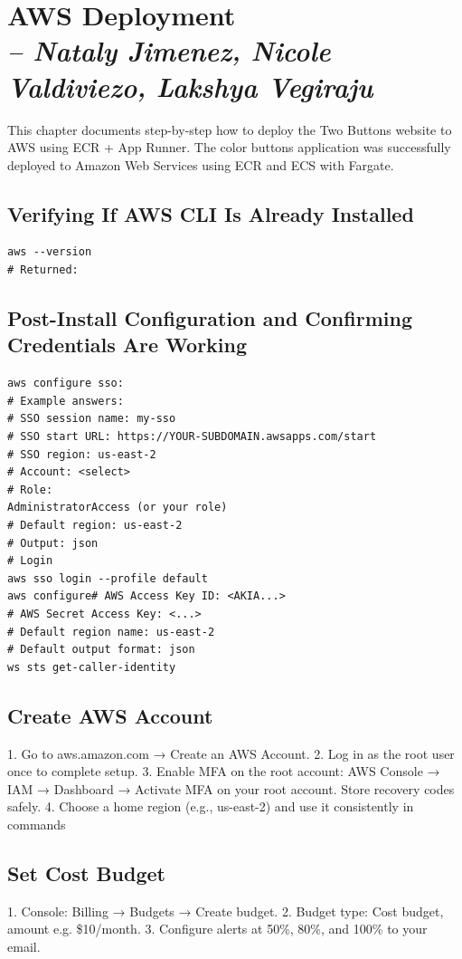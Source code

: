\chapter{AWS Deployment \\
\small{\textit{-- Nataly Jimenez, Nicole Valdiviezo, Lakshya Vegiraju}}
\label{Chapter::AWS Deployment}}

This chapter documents step-by-step how to deploy the Two Buttons website to AWS using ECR + App Runner. The color buttons application was successfully deployed to Amazon Web Services using ECR and ECS with Fargate.

\section{Verifying If AWS CLI Is Already Installed}

\begin{verbatim}
aws --version
# Returned: 
\end{verbatim}

\section{Post-Install Configuration and Confirming Credentials Are Working}
\begin{verbatim}
aws configure sso:
# Example answers:
# SSO session name: my-sso
# SSO start URL: https://YOUR-SUBDOMAIN.awsapps.com/start
# SSO region: us-east-2
# Account: <select>
# Role:
AdministratorAccess (or your role)
# Default region: us-east-2
# Output: json
# Login
aws sso login --profile default
aws configure# AWS Access Key ID: <AKIA...>
# AWS Secret Access Key: <...>
# Default region name: us-east-2
# Default output format: json
ws sts get-caller-identity
\end{verbatim}

\section{Create AWS Account}
1. Go to aws.amazon.com → Create an AWS Account.
2. Log in as the root user once to complete setup.
3. Enable MFA on the root account: AWS Console → IAM → Dashboard → Activate MFA on
your root account. Store recovery codes safely.
4. Choose a home region (e.g., us-east-2) and use it consistently in commands

\section{Set Cost Budget}
1. Console: Billing → Budgets → Create budget.
2. Budget type: Cost budget, amount e.g. \$10/month.
3. Configure alerts at 50\%, 80\%, and 100\% to your email.

